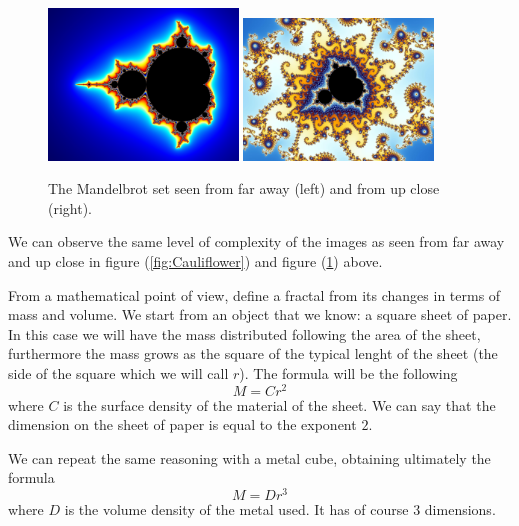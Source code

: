 \documentclass[a4paper,12pt]{article}
\begin{document}
\begin{figure}[h]
    \centering
    \begin{minipage}{1\textwidth}
        \centering
        \includegraphics[width = 0.45\textwidth]{Mandelbrot_far.jpg}
        \includegraphics[width = 0.45\textwidth]{MAndelbrot_close.jpg}
    \end{minipage}
    \caption{The Mandelbrot set seen from far away (left) and from up close (right).}
    \label{fig:Mandelbrot}
\end{figure}

\par We can observe the same level of complexity of the images as seen from far away 
and up close in figure (\ref{fig:Cauliflower}) and figure (\ref{fig:Mandelbrot}) above.

\par From a mathematical point of view, define a fractal from its changes 
in terms of mass and volume. We start from an object that we know: a square sheet 
of paper. In this case we will have the mass distributed following the area of 
the sheet, furthermore the mass grows as the square of the typical lenght of the 
sheet (the side of the square which we will call $r$). The formula will be the 
following 
\[ M = C r^2 \]
where $C$ is the surface density of the material of the sheet. We can say that the 
dimension on the sheet of paper is equal to the exponent $2$.

We can repeat the same reasoning with a metal cube, obtaining ultimately the formula
\[ M = D r^3 \]
where $D$ is the volume density of the metal used. It has of course $3$ dimensions.
\end{document}
